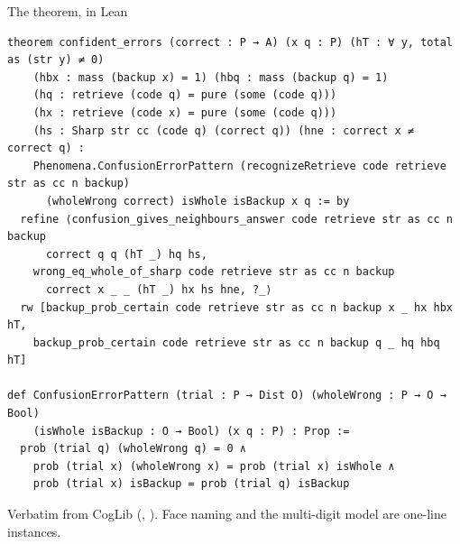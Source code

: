 \documentclass[aspectratio=169,11pt]{beamer}
\begin{document}
\begin{frame}[fragile]{The theorem, in Lean}
\begin{Verbatim}[fontsize=\scriptsize, breaklines=false]
theorem confident_errors (correct : P → A) (x q : P) (hT : ∀ y, total as (str y) ≠ 0)
    (hbx : mass (backup x) = 1) (hbq : mass (backup q) = 1)
    (hq : retrieve (code q) = pure (some (code q)))
    (hx : retrieve (code x) = pure (some (code q)))
    (hs : Sharp str cc (code q) (correct q)) (hne : correct x ≠ correct q) :
    Phenomena.ConfusionErrorPattern (recognizeRetrieve code retrieve str as cc n backup)
      (wholeWrong correct) isWhole isBackup x q := by
  refine ⟨confusion_gives_neighbours_answer code retrieve str as cc n backup
      correct q q (hT _) hq hs,
    wrong_eq_whole_of_sharp code retrieve str as cc n backup
      correct x _ _ (hT _) hx hs hne, ?_⟩
  rw [backup_prob_certain code retrieve str as cc n backup x _ hx hbx hT,
    backup_prob_certain code retrieve str as cc n backup q _ hq hbq hT]

def ConfusionErrorPattern (trial : P → Dist O) (wholeWrong : P → O → Bool)
    (isWhole isBackup : O → Bool) (x q : P) : Prop :=
  prob (trial q) (wholeWrong q) = 0 ∧
    prob (trial x) (wholeWrong x) = prob (trial x) isWhole ∧
    prob (trial x) isBackup = prob (trial q) isBackup
\end{Verbatim}
  \footnotesize Verbatim from CogLib (, ). Face naming and the multi-digit model are one-line instances.
\end{frame}
\end{document}

